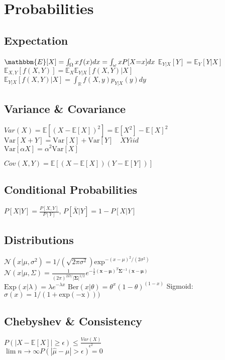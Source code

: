 \section*{Probabilities}
\subsection*{Expectation}
$\mathbbm{E}[X]=\int_{\Omega}xf(x)dx=\int_{\omega}xP[X{=}x]dx$
$\mathbb{E}_{Y|X}[Y]=\mathbb{E}_{Y}[Y|X]$\\
$\mathbb{E}_{X,Y}[f(X,Y)]=\mathbb{E}_{X}\mathbb{E}_{Y|X}[f(X,Y)|X]$\\
$\mathbb{E}_{Y|X}[f(X,Y)|X]{=}\int_\mathbb{R}f(X,y)p_{Y|X}(y)dy$

\subsection*{Variance \& Covariance}
$Var(X){=}\mathbb{E}[(X{-}\mathbb{E}[X])^2]{=}\mathbb{E}[X^2]{-}\mathbb{E}[X]^2$\\
$\mathrm{Var}[X+Y]{=}\mathrm{Var}[X]+\mathrm{Var}[Y]\quad XY iid$\\
$\mathrm{Var}[\alpha X]=\alpha^2\mathrm{Var}[X]$

$Cov(X,Y)=\mathbb{E}[(X-\mathbb{E}[X])(Y-\mathbb{E}[Y])]$
\subsection*{Conditional Probabilities}
$P[X|Y]=\frac{P[X,Y]}{P[Y]}$, 
$P[\bar{X}|Y]=1-P[X|Y]$
\subsection*{Distributions}
$\mathcal{N}(x|\mu, \sigma^2)=1/(\sqrt{2\pi\sigma^2})\mathrm{exp}^{-(x-\mu)^2/(2\sigma^2)}$\\
$\mathcal{N}(x|\mu, \Sigma)= \frac{1}{(2\pi)^{2D/}|\mathbf{\Sigma}|^{1/2}} e^{-\frac{1}{2}(\mathbf{x}-\mathbf{\mu})^T\mathbf{\Sigma}^{-1}(\mathbf{x}-\mathbf{\mu})}$\\
$\mathrm{Exp}(x|\lambda){=}\lambda e^{-\lambda x}$ $\mathrm{Ber}(x|\theta){=}\theta^x (1{-}\theta)^{(1-x)}$
Sigmoid: $\sigma(x)=1/(1+\mathrm{exp(-x)}))$

\subsection*{Chebyshev \& Consistency}
$P(|X-\mathbb{E}[X]|\geq \epsilon)\leq \frac{Var(X)}{\epsilon^2}$\\
$\lim{n\rightarrow\infty} P(|\hat{\mu}-\mu |>\epsilon)=0$

